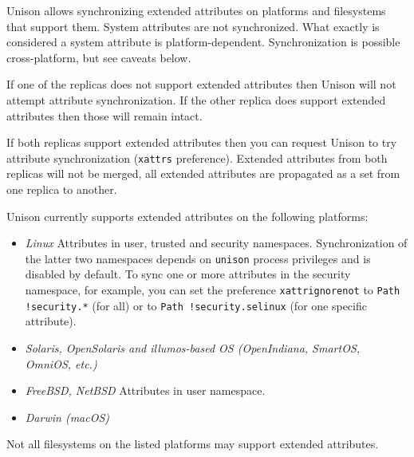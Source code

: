 \documentclass{article}
\begin{document}

Unison allows synchronizing extended attributes on platforms and
filesystems that support them. System attributes are not synchronized.
What exactly is considered a system attribute is platform-dependent.
Synchronization is possible cross-platform, but see caveats below.

If one of the replicas does not support extended attributes then
Unison will not attempt attribute synchronization. If the other
replica does support extended attributes then those will remain intact.

If both replicas support extended attributes then you can request
Unison to try attribute synchronization (\verb|xattrs| preference).
Extended attributes from both replicas will not be merged, all extended
attributes are propagated as a set from one replica to another.

Unison currently supports extended attributes on the following platforms:
\begin{itemize}
\item {\em Linux}
Attributes in user, trusted and security namespaces. Synchronization of
the latter two namespaces depends on \verb|unison| process privileges
and is disabled by default. To sync one or more attributes in the security
namespace, for example, you can set the preference
\verb|xattrignorenot| to \verb|Path !security.*| (for all) or to
\verb|Path !security.selinux| (for one specific attribute).
\item {\em Solaris, OpenSolaris and illumos-based OS (OpenIndiana, SmartOS,
  OmniOS, etc.)}
\item {\em FreeBSD, NetBSD}
Attributes in user namespace.
\item {\em Darwin (macOS)}
\end{itemize}
Not all filesystems on the listed platforms may support extended attributes.
\end{document}

